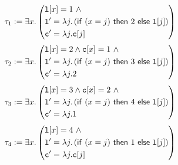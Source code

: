 \begin{frame}[fragile]
\begin{columns}
\begin{column}{.18\textwidth}
\begin{overlayarea}{\textwidth}{8cm}
\end{overlayarea}
\end{column}

\begin{column}{.52\textwidth}
\vspace{-1cm}
{\scriptsize
$$
\tau_1 := \exists x. \left(
\begin{aligned}
& {\tt l}[x] = 1 \ \wedge \\
& {\tt l}' = \lambda j. \left({\sf if}~(x = j)~{\sf then}~2~{\sf else}~{\tt l}[j]\right) \\
& {\tt c}' = \lambda j. {\tt c}[j]
\end{aligned}
\right)
$$
$$
\tau_2 := \exists x. \left(
\begin{aligned}
& {\tt l}[x] = 2 \wedge {\tt c}[x] = 1\ \wedge \\
& {\tt l}' = \lambda j. \left({\sf if}~(x = j)~{\sf then}~3~{\sf else}~{\tt l}[j]\right) \\
& {\tt c}' = \lambda j. 2
\end{aligned}
\right)
$$
$$
\tau_3 := \exists x. \left(
\begin{aligned}
& {\tt l}[x] = 3 \wedge {\tt c}[x] = 2\ \wedge \\
& {\tt l}' = \lambda j. \left({\sf if}~(x = j)~{\sf then}~4~{\sf else}~{\tt l}[j]\right) \\
& {\tt c}' = \lambda j. 1
\end{aligned}
\right)
$$
$$
\tau_4 := \exists x. \left(
\begin{aligned}
& {\tt l}[x] = 4 \ \wedge \\
& {\tt l}' = \lambda j. \left({\sf if}~(x = j)~{\sf then}~1~{\sf else}~{\tt l}[j]\right) \\
& {\tt c}' = \lambda j. {\tt c}[j]
\end{aligned}
\right)
$$
}
\end{column}


\end{columns}
\end{frame}
